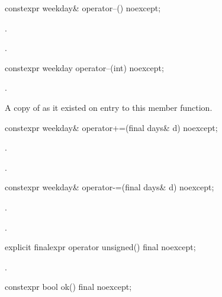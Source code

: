 %
\begin{itemdecl}
constexpr weekday& operator--() noexcept;
\end{itemdecl}

\begin{itemdescr}
\pnum
\effects {}.

\pnum
\returns {}.
\end{itemdescr}

%
\begin{itemdecl}
constexpr weekday operator--(int) noexcept;
\end{itemdecl}

\begin{itemdescr}
\pnum
\effects {}.

\pnum
\returns A copy of  as it existed on entry to this member function.
\end{itemdescr}

%
\begin{itemdecl}
constexpr weekday& operator+=(final days& d) noexcept;
\end{itemdecl}

\begin{itemdescr}
\pnum
\effects {}.

\pnum
\returns {}.
\end{itemdescr}

%
\begin{itemdecl}
constexpr weekday& operator-=(final days& d) noexcept;
\end{itemdecl}

\begin{itemdescr}
\pnum
\effects {}.

\pnum
\returns {}.
\end{itemdescr}

%
\begin{itemdecl}
explicit finalexpr operator unsigned() final noexcept;
\end{itemdecl}

\begin{itemdescr}
\pnum
\returns {}.
\end{itemdescr}

%
\begin{itemdecl}
constexpr bool ok() final noexcept;
\end{itemdecl}

